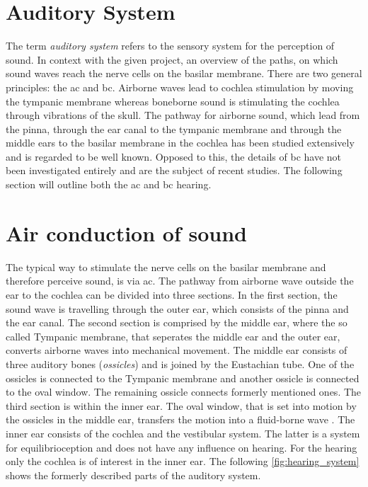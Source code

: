 \section{Auditory System}
The term \textit{auditory system} refers to the sensory system for the perception of sound. In context with the given project, an overview of the paths, on which sound waves reach the nerve cells on the basilar membrane. There are two general principles: the \gls{ac} and \gls{bc}. Airborne waves lead to cochlea stimulation by moving the tympanic membrane whereas boneborne sound is stimulating the cochlea through vibrations of the skull. The pathway for airborne sound, which lead from the pinna, through the ear canal to the tympanic membrane and through the middle ears to the basilar membrane in the cochlea has been studied extensively and is regarded to be well known. Opposed to this, the details of \gls{bc} have not been investigated entirely \citep{stenfelt_2005} and are the subject of recent studies. The following section will outline both the \gls{ac} and \gls{bc} hearing.


\section{Air conduction of sound}
The typical way to stimulate the nerve cells on the basilar membrane and therefore perceive sound, is via \gls{ac}. The pathway from airborne wave outside the ear to the cochlea can be divided into three sections. In the first section, the sound wave is travelling through the outer ear, which consists of the pinna and the ear canal. The second section is comprised by the middle ear, where the so called Tympanic membrane, that seperates the middle ear and the outer ear, converts airborne waves into mechanical movement. The middle ear consists of three auditory bones (\textit{ossicles}) and is joined by the Eustachian tube. One of the ossicles is connected to the Tympanic membrane and another ossicle is connected to the oval window. The remaining ossicle connects formerly mentioned ones. The third section is within the inner ear. The oval window, that is set into motion by the ossicles in the middle ear, transfers the motion into a fluid-borne wave \citep{ho_2017}. The inner ear consists of the cochlea and the vestibular system. The latter is a system for equilibrioception and does not have any influence on hearing. For the hearing only the cochlea is of interest in the inner ear. The following \autoref{fig:hearing_system} shows the formerly described parts of the auditory system.


